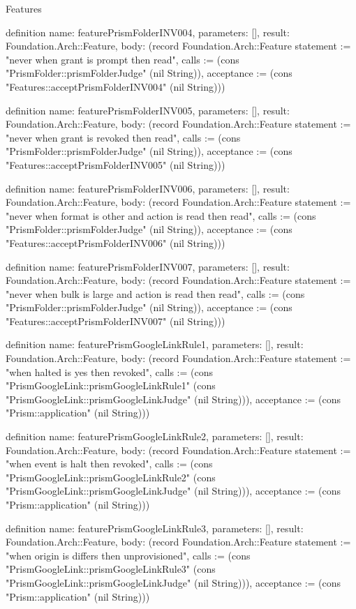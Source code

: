 \begin{lexlean}{Features}
\begin{semanticmodule}
definition{
  name: featurePrismFolderINV004,
  parameters: [],
  result: Foundation.Arch::Feature,
  body: (record Foundation.Arch::Feature {statement := "never when grant is prompt then read", calls := (cons "PrismFolder::prismFolderJudge" (nil String)), acceptance := (cons "Features::acceptPrismFolderINV004" (nil String))})
}

definition{
  name: featurePrismFolderINV005,
  parameters: [],
  result: Foundation.Arch::Feature,
  body: (record Foundation.Arch::Feature {statement := "never when grant is revoked then read", calls := (cons "PrismFolder::prismFolderJudge" (nil String)), acceptance := (cons "Features::acceptPrismFolderINV005" (nil String))})
}

definition{
  name: featurePrismFolderINV006,
  parameters: [],
  result: Foundation.Arch::Feature,
  body: (record Foundation.Arch::Feature {statement := "never when format is other and action is read then read", calls := (cons "PrismFolder::prismFolderJudge" (nil String)), acceptance := (cons "Features::acceptPrismFolderINV006" (nil String))})
}

definition{
  name: featurePrismFolderINV007,
  parameters: [],
  result: Foundation.Arch::Feature,
  body: (record Foundation.Arch::Feature {statement := "never when bulk is large and action is read then read", calls := (cons "PrismFolder::prismFolderJudge" (nil String)), acceptance := (cons "Features::acceptPrismFolderINV007" (nil String))})
}

definition{
  name: featurePrismGoogleLinkRule1,
  parameters: [],
  result: Foundation.Arch::Feature,
  body: (record Foundation.Arch::Feature {statement := "when halted is yes then revoked", calls := (cons "PrismGoogleLink::prismGoogleLinkRule1" (cons "PrismGoogleLink::prismGoogleLinkJudge" (nil String))), acceptance := (cons "Prism::application" (nil String))})
}

definition{
  name: featurePrismGoogleLinkRule2,
  parameters: [],
  result: Foundation.Arch::Feature,
  body: (record Foundation.Arch::Feature {statement := "when event is halt then revoked", calls := (cons "PrismGoogleLink::prismGoogleLinkRule2" (cons "PrismGoogleLink::prismGoogleLinkJudge" (nil String))), acceptance := (cons "Prism::application" (nil String))})
}

definition{
  name: featurePrismGoogleLinkRule3,
  parameters: [],
  result: Foundation.Arch::Feature,
  body: (record Foundation.Arch::Feature {statement := "when origin is differs then unprovisioned", calls := (cons "PrismGoogleLink::prismGoogleLinkRule3" (cons "PrismGoogleLink::prismGoogleLinkJudge" (nil String))), acceptance := (cons "Prism::application" (nil String))})
}


\end{semanticmodule}
\end{lexlean}
